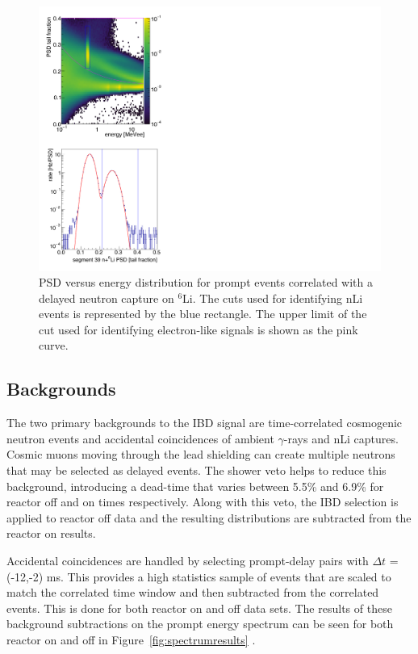 \begin{figure}[h]
	\centering
	\includegraphics[width=0.5\linewidth]{tex/7-oscillation-images/PSDvsE_Corr_nLi}
	\caption{PSD versus energy distribution for prompt events correlated with a delayed neutron capture on $^6$Li. The cuts used for identifying nLi events is represented by the blue rectangle. The upper limit of the cut used for identifying electron-like signals is shown as the pink curve.}
	\label{fig:psdvsecorrnli}
\end{figure}



\subsection{Backgrounds}

The two primary backgrounds to the IBD signal are time-correlated cosmogenic neutron events and accidental coincidences of ambient $\gamma$-rays and nLi captures.
Cosmic muons moving through the lead shielding can create multiple neutrons that may be selected as delayed events.
The shower veto helps to reduce this background, introducing a dead-time that varies between 5.5\% and 6.9\% for reactor off and on times respectively.
Along with this veto, the IBD selection is applied to reactor off data and the resulting distributions are subtracted from the reactor on results.

Accidental coincidences are handled by selecting prompt-delay pairs with $\Delta t$ = (-12,-2) ms.
This provides a high statistics sample of events that are scaled to match the correlated time window and then subtracted from the correlated events. 
This is done for both reactor on and off data sets. 
The results of these background subtractions on the prompt energy spectrum can be seen for both reactor on and off in Figure~\ref{fig:spectrumresults} \cite{Ashenfelter:2018jrx}.

